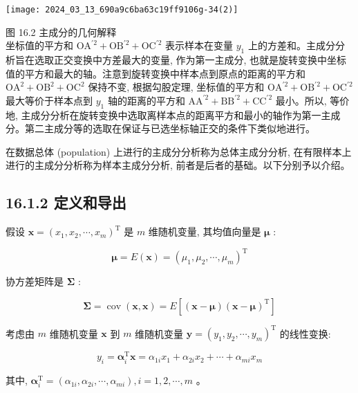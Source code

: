 \documentclass[10pt]{article}
\begin{document}
\begin{center}
\texttt{[image: 2024\_03\_13\_690a9c6ba63c19ff9106g-34(2)]}
\end{center}

图 16.2 主成分的几何解释\\
坐标值的平方和 $\mathrm{OA}^{\prime 2}+\mathrm{OB}^{\prime 2}+\mathrm{OC}^{\prime 2}$ 表示样本在变量 $y_{1}$ 上的方差和。主成分分析旨在选取正交变换中方差最大的变量, 作为第一主成分, 也就是旋转变换中坐标值的平方和最大的轴。注意到旋转变换中样本点到原点的距离的平方和 $\mathrm{OA}^{2}+\mathrm{OB}^{2}+\mathrm{OC}^{2}$ 保持不变, 根据勾股定理, 坐标值的平方和 $\mathrm{OA}^{\prime 2}+\mathrm{OB}^{\prime 2}+\mathrm{OC}^{\prime 2}$ 最大等价于样本点到 $y_{1}$ 轴的距离的平方和 $\mathrm{AA}^{\prime 2}+\mathrm{BB}^{\prime 2}+\mathrm{CC}^{\prime 2}$ 最小。所以, 等价地, 主成分分析在旋转变换中选取离样本点的距离平方和最小的轴作为第一主成分。第二主成分等的选取在保证与已选坐标轴正交的条件下类似地进行。

在数据总体 (population) 上进行的主成分分析称为总体主成分分析, 在有限样本上进行的主成分分析称为样本主成分分析, 前者是后者的基础。以下分别予以介绍。

\subsection*{16.1.2 定义和导出}
假设 $\boldsymbol{x}=\left(x_{1}, x_{2}, \cdots, x_{m}\right)^{\mathrm{T}}$ 是 $m$ 维随机变量, 其均值向量是 $\boldsymbol{\mu}$ :

$$
\boldsymbol{\mu}=E(\boldsymbol{x})=\left(\mu_{1}, \mu_{2}, \cdots, \mu_{m}\right)^{\mathrm{T}}
$$

协方差矩阵是 $\boldsymbol{\Sigma}$ :

$$
\boldsymbol{\Sigma}=\operatorname{cov}(\boldsymbol{x}, \boldsymbol{x})=E\left[(\boldsymbol{x}-\boldsymbol{\mu})(\boldsymbol{x}-\boldsymbol{\mu})^{\mathrm{T}}\right]
$$

考虑由 $m$ 维随机变量 $\boldsymbol{x}$ 到 $m$ 维随机变量 $\boldsymbol{y}=\left(y_{1}, y_{2}, \cdots, y_{m}\right)^{\mathrm{T}}$ 的线性变换:


\begin{equation*}
y_{i}=\boldsymbol{\alpha}_{i}^{\mathrm{T}} \boldsymbol{x}=\alpha_{1 i} x_{1}+\alpha_{2 i} x_{2}+\cdots+\alpha_{m i} x_{m} \tag{16.1}
\end{equation*}


其中, $\boldsymbol{\alpha}_{i}^{\mathrm{T}}=\left(\alpha_{1 i}, \alpha_{2 i}, \cdots, \alpha_{m i}\right), i=1,2, \cdots, m$ 。
\end{document}
